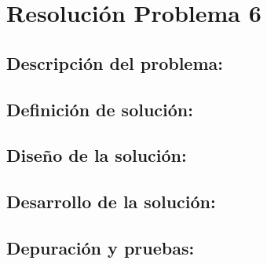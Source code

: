 \section{Resolución Problema 6}

\subsection{\textbf{Descripción del problema:}}

\subsection{\textbf{Definición de solución:}}

\subsection{\textbf{Diseño de la solución:}}

\subsection{\textbf{Desarrollo de la solución:}}

\subsection{\textbf{Depuración y pruebas:}}